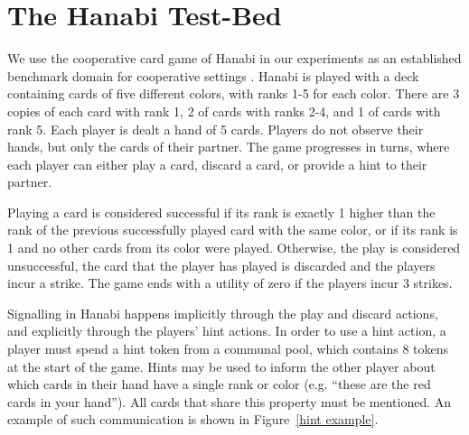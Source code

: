 \documentclass[letterpaper]{article} %
\begin{document}
\section{The Hanabi Test-Bed}

We use the cooperative card game of Hanabi in our experiments as an established benchmark domain for cooperative settings \cite{bard2020hanabi}.
Hanabi is played with a deck containing cards of five different colors, with ranks 1-5 for each color. There are 3 copies of each card with rank 1, 2 of cards with ranks 2-4, and 1 of cards with rank 5. Each player is dealt a hand of 5 cards. Players do not observe their hands, but only the cards of their partner.
The game progresses in turns, where each player can either play a card, discard a card, or provide a hint to their partner.



Playing a card is considered successful if its rank is exactly 1 higher than the rank of the previous successfully played card with the same color,
or if its rank is 1 and no other cards from its color were played.
Otherwise, the play is considered unsuccessful, the card that the player has played is discarded and the players incur a strike. The game ends with a utility of zero if the players incur 3 strikes.





Signalling in Hanabi happens implicitly through the play and discard actions, and explicitly through the players' hint actions.
In order to use a hint action, a player must   spend a hint token from a communal pool, which contains 8 tokens at the start of the game. Hints may be used to inform the other player about which cards in their hand have a single rank or color (e.g. ``these are the red cards in your hand''). All cards that share this property must be mentioned. An example of such communication is shown in Figure~\ref{hint example}.
\end{document}
